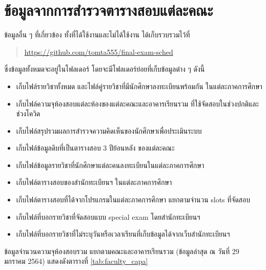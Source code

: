 \section{ข้อมูลจากการสำรวจตารางสอบแต่ละคณะ}
ข้อมูลอื่น ๆ ที่เกี่ยวข้อง ทั้งที่ได้ใช้งานและไม่ได้ใช้งาน ได้เก็บรวบรวมไว้ที่
\begin{quote}
\small
\url{https://github.com/tomta555/final-exam-sched}
\end{quote}
ซึ่งข้อมูลทั้งหมดจะอยู่ในโฟลเดอร์  โดยจะมีโฟลเดอร์ย่อยที่เก็บข้อมูลต่าง ๆ ดังนี้ 
\begin{itemize}
  \item {} เก็บไฟล์รายวิชาทั้งหมด และไฟล์คู่รายวิชาที่มีนักศึกษาลงทะเบียนพร้อมกัน ในแต่ละภาคการศึกษา
  \item {} เก็บไฟล์ความจุห้องสอบแต่ละห้องของแต่ละคณะและอาคารเรียนรวม ที่ใช้จัดสอบในช่วงปกติและช่วงโควิด
  \item {} เก็บไฟล์สรุปรวมผลการสำรวจความคิดเห็นของนักศึกษาเพื่อประเมินระบบ
  \item {} เก็บไฟล์ข้อมูลดิบที่เป็นตารางสอบ 3 ปีย้อนหลัง ของแต่ละคณะ
  \item {} เก็บไฟล์ข้อมูลรายวิชาที่นักศึกษาแต่ละคนลงทะเบียนในแต่ละภาคการศึกษา
  \item {} เก็บไฟล์ตารางสอบของสำนักทะเบียนฯ ในแต่ละภาคการศึกษา
  \item {} เก็บไฟล์ตารางสอบที่ได้จากโปรแกรมในแต่ละภาคการศึกษา แยกตามจำนวน slots ที่จัดสอบ
  \item {} เก็บไฟล์ที่บอกรายวิชาที่จัดสอบแบบ special exam โดยสำนักทะเบียนฯ
  \item {} เก็บไฟล์ที่บอกรายวิชาที่ไม่ระบุวันหรือเวลาเรียนที่เก็บข้อมูลได้จากเว็บสำนักทะเบียนฯ
\end{itemize}

\noindent ข้อมูลจำนวนความจุห้องสอบรวม แยกตามคณะและอาคารเรียนรวม (ข้อมูลล่าสุด ณ วันที่ 29 มกราคม 2564) แสดงดังตารางที่ \ref{tab:faculty_capa}

